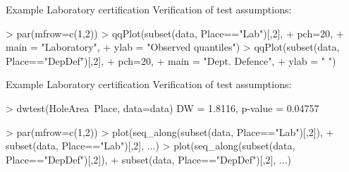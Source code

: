 \documentclass[t]{beamer}
\begin{document}
\begin{ftstf}
{Example}
{Laboratory certification}
Verification of test assumptions:
\begin{rcode}
> par(mfrow=c(1,2))
> qqPlot(subset(data, Place=="Lab")[,2],
+        pch=20,
+        main = "Laboratory",
+        ylab = "Observed quantiles")
> qqPlot(subset(data, Place=="DepDef")[,2],
+        pch=20,
+        main = "Dept. Defence",
+        ylab = " ")
\end{rcode}
\end{ftstf}


\begin{ftstf}
{Example}
{Laboratory certification}
Verification of test assumptions:
\begin{rcode}
> dwtest(HoleArea~Place, data=data)
DW = 1.8116, p-value = 0.04757

> par(mfrow=c(1,2))
> plot(seq_along(subset(data, Place=="Lab")[,2]),
+      subset(data, Place=="Lab")[,2], ...)
> plot(seq_along(subset(data, Place=="DepDef")[,2]),
+      subset(data, Place=="DepDef")[,2], ...)
\end{rcode}
\end{ftstf}
\end{document}
